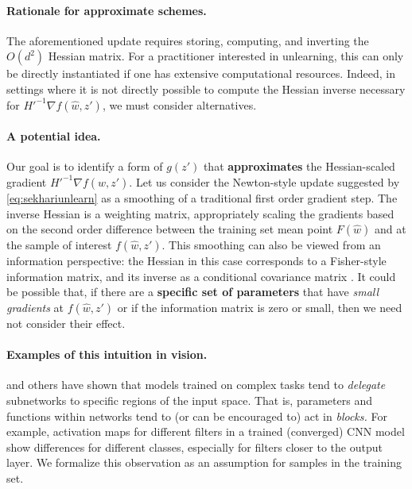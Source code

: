 \paragraph{Rationale for approximate schemes.}
The aforementioned update requires storing, computing, and inverting the $O(d^2)$ Hessian matrix.
For a practitioner interested in unlearning, this can only be directly instantiated if one has extensive computational resources.
Indeed, in settings where it is not directly possible to compute the Hessian inverse necessary for $H'^{-1} \nabla f(\hat{w},z')$, we must consider alternatives. 

\paragraph{A potential idea.} Our goal is to identify a form of $g(z')$ that \textbf{approximates} the Hessian-scaled gradient $H'^{-1} \nabla f(\hat{w},z')$. 
Let us consider the Newton-style update suggested by 
\eqref{eq:sekhariunlearn}
as a smoothing of a traditional first order gradient step. 
The inverse Hessian is a weighting matrix, appropriately scaling the gradients based on the second order difference between the training set mean point $F(\hat{w})$ and at the sample of interest $f(\hat{w},z')$. 
This smoothing can also be viewed from an information perspective: the Hessian in this case corresponds to a Fisher-style information matrix, and its inverse as a conditional covariance matrix \citep{Golatkar_2021_CVPR,golatkar2020forgetting}.
It could be possible that, if there are a \textbf{specific set of parameters} that have {\em small gradients} at $f(\hat{w},z')$ or if the information matrix is zero or small, then we need not consider their effect. 

\paragraph{Examples of this intuition in vision.} \cite{bau2017network,fong2018net2vec,Sun_2019_ICCV} and others have shown that models trained on complex tasks tend to \textit{delegate} subnetworks to specific regions of the input space. That is, parameters and functions within networks tend to (or can be encouraged to) act in \textit{blocks.}
For example, activation maps for different filters in a trained (converged) CNN model show differences for different classes, especially for filters closer to the output layer.
We formalize this observation as an assumption for samples in the training set.

